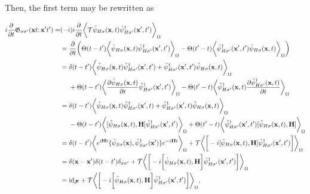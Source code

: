 \documentclass{homework}
\begin{document}
Then, the first term may be rewritten as 
    
    \begin{equation}
        \begin{split}
            i\frac{\partial}{\partial t} \mathfrak{G}_{\sigma \sigma'}({\bf x} t; {\bf x}' t') = &(-i) i \frac{\partial}{\partial t} \bigg\langle \mathcal{T} \hat{\psi}_{H \sigma}({\bf x}, t) \hat{\psi}^\dagger_{H \sigma'}({\bf x}', t') \bigg \rangle_{\Omega}\\
            &= \frac{\partial}{\partial t} \bigg(\Theta(t-t')\bigg\langle \hat{\psi}_{H \sigma}({\bf x}, t) \hat{\psi}^\dagger_{H \sigma'}({\bf x}', t') \bigg \rangle_{\Omega} -\Theta(t'-t) \bigg\langle\hat{\psi}^\dagger_{H \sigma'}({\bf x}', t')\hat{\psi}_{H \sigma}({\bf x}, t)  \bigg \rangle_{\Omega}  \bigg)\\
            &= \delta(t-t')\bigg\langle \hat{\psi}_{H \sigma}({\bf x}, t) \hat{\psi}^\dagger_{H \sigma'}({\bf x}', t') +  \hat{\psi}^\dagger_{H \sigma'}({\bf x}', t')\hat{\psi}_{H \sigma}({\bf x}, t) \bigg \rangle_{\Omega} \\
            & \textnormal{ } \textnormal{ } \textnormal{ } \textnormal{ }+ \Theta(t-t') \bigg\langle \frac{\partial\hat{\psi}_{H \sigma}({\bf x}, t)}{\partial t} \hat{\psi}^\dagger_{H \sigma'}({\bf x}', t') \bigg \rangle_{\Omega} - \Theta(t'-t) \bigg\langle \hat{\psi}^\dagger_{H \sigma'}({\bf x}, t)  \frac{\partial \hat{\psi}^\dagger_{H \sigma'}({\bf x}, t)}{\partial t} \bigg \rangle_{\Omega}\\
            &= \delta(t-t') \bigg\langle \hat{\psi}_{H \sigma}({\bf x}, t) \hat{\psi}^\dagger_{H \sigma'}({\bf x}', t) +  \hat{\psi}^\dagger_{H \sigma'}({\bf x}', t)\hat{\psi}_{H \sigma}({\bf x}, t) \bigg \rangle_{\Omega} \\
            & \textnormal{ } \textnormal{ } \textnormal{ } \textnormal{ }
            - \Theta(t-t') \bigg\langle [\hat{\psi}_{H \sigma}({\bf x}, t), {\bf H}] \hat{\psi}^\dagger_{H \sigma'}({\bf x}', t') \bigg \rangle_{\Omega} + \Theta(t'-t) \bigg\langle\hat{\psi}^\dagger_{H \sigma'}({\bf x}', t') [\hat{\psi}_{H \sigma}({\bf x}, t), {\bf H}] \bigg \rangle_{\Omega} \\
            &= \delta(t-t') \bigg\langle e^{i {\bf H} t} \{\hat{\psi}_{S \sigma}({\bf x}), \hat{\psi}^\dagger_{S \sigma'}({\bf x}')\} e^{-i {\bf H} t} \bigg \rangle_{\Omega} + \mathcal{T} \bigg\langle \bigg[-i [\hat{\psi}_{H \sigma}({\bf x}, t), {\bf H}] \hat{\psi}^\dagger_{H \sigma'}({\bf x}', t') \bigg] \bigg \rangle_{\Omega} \\
            &= \delta({\bf x} - {\bf x}') \delta(t-t') \delta_{\sigma \sigma'} + \mathcal{T} \bigg\langle \bigg[-i \bigg[\hat{\psi}_{H \sigma}({\bf x}, t), {\bf H}\bigg] \hat{\psi}^\dagger_{H \sigma'}({\bf x}', t') \bigg] \bigg \rangle_{\Omega} \\
            &= \textnormal{id}_{\bm{\mathcal{F}}} + \mathcal{T} \bigg\langle \bigg[-i \bigg[\hat{\psi}_{H \sigma}({\bf x}, t), {\bf H}\bigg] \hat{\psi}^\dagger_{H \sigma'}({\bf x}', t') \bigg] \bigg \rangle_{\Omega}, 
        \end{split}
    \end{equation}
    
\end{document}
